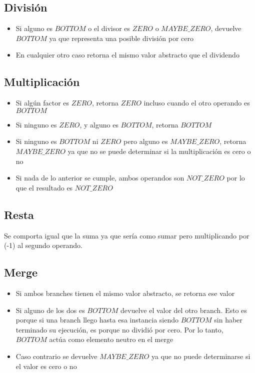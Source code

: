 \subsection*{División}
\begin{itemize}
\item Si alguno es $BOTTOM$ o el divisor es $ZERO$ o $MAYBE\_ZERO$, devuelve $BOTTOM$ ya que representa una posible división por cero \\
\item En cualquier otro caso retorna el mismo valor abstracto que el dividendo
\end{itemize}

\subsection*{Multiplicación}
\begin{itemize}
\item Si algún factor es $ZERO$, retorna $ZERO$ incluso cuando el otro operando es $BOTTOM$ \\
\item Si ninguno es $ZERO$, y alguno es $BOTTOM$, retorna $BOTTOM$ \\
\item Si ninguno es $BOTTOM$ ni $ZERO$ pero alguno es $MAYBE\_ZERO$, retorna $MAYBE\_ZERO$ ya que no se puede determinar si la multiplicación es cero o no \\
\item Si nada de lo anterior se cumple, ambos operandos son $NOT\_ZERO$ por lo que el resultado es $NOT\_ZERO$
\end{itemize}

\subsection*{Resta}
Se comporta igual que la suma ya que sería como sumar pero multiplicando por (-1) al segundo operando.

\subsection*{Merge}
\begin{itemize}
\item Si ambos branches tienen el mismo valor abstracto, se retorna ese valor
\item Si alguno de los dos es $BOTTOM$ devuelve el valor del otro branch. Esto es porque si una branch llego hasta esa instancia siendo $BOTTOM$ sin haber terminado su ejecución, es porque no dividió por cero. Por lo tanto, $BOTTOM$ actúa como elemento neutro en el merge
\item Caso contrario se devuelve $MAYBE\_ZERO$ ya que no puede determinarse si el valor es cero o no
\end{itemize}
